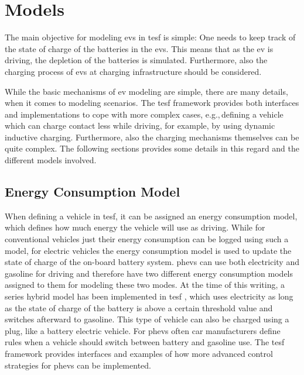 \section{Models}
The main objective for modeling \glspl{ev} in \gls{tesf} is simple: One needs to keep track of the state of charge of the batteries in the \glspl{ev}. This means that as the \gls{ev} is driving, the depletion of the batteries is simulated. Furthermore, also the charging process of \glspl{ev} at charging infrastructure should be considered.

While the basic mechanisms of \gls{ev} modeling are simple, there are many details, when it comes to modeling scenarios. The \gls{tesf} framework provides both interfaces and implementations to cope with more complex cases, e.g.,\,defining a vehicle which can charge contact less while driving, for example, by using dynamic inductive charging. Furthermore, also the charging mechanisms themselves can be quite complex. The following sections provides some details in this regard and the different models involved.

\subsection{Energy Consumption Model}
When defining a vehicle in \gls{tesf}, it can be assigned an energy consumption model, which defines how much energy the vehicle will use as driving. While for conventional vehicles just their energy consumption can be logged using such a model, for electric vehicles the energy consumption model is used to update the state of charge of the on-board battery system. \glspl{phev} can use both electricity and gasoline for driving and therefore have two different energy consumption models assigned to them for modeling these two modes. At the time of this writing, a series hybrid model has been implemented in \gls{tesf} \citep[][]{Chan_PIEEE_2007}, which uses electricity as long as the state of charge of the battery is above a certain threshold value and switches afterward to gasoline. This type of vehicle can also be charged using a plug, like a battery electric vehicle. For \glspl{phev} often car manufacturers define rules when a vehicle should switch between battery and gasoline use. The \gls{tesf} framework provides interfaces and examples of how more advanced control strategies for \glspl{phev} can be implemented.

